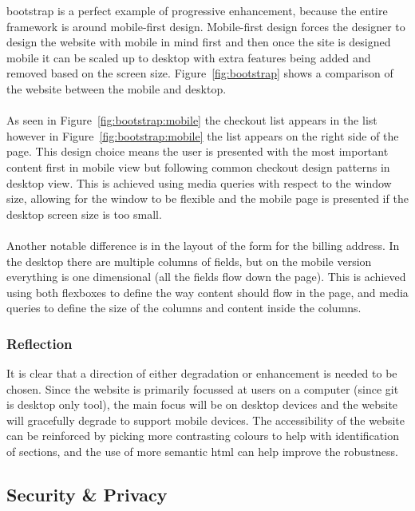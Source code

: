 \gls{bootstrap} is a perfect example of progressive enhancement, because the entire framework is around mobile-first design. Mobile-first design forces the designer to design the website with mobile in mind first and then once the site is designed mobile it can be scaled up to desktop with extra features being added and removed based on the screen size. Figure~\ref{fig:bootstrap} shows a comparison of the website between the mobile and desktop.\\\\
As seen in Figure~\ref{fig:bootstrap:mobile} the checkout list appears in the list however in Figure~\ref{fig:bootstrap:mobile} the list appears on the right side of the page. This design choice means the user is presented with the most important content first in mobile view but following common checkout design patterns in desktop view. This is achieved using media queries with respect to the window size, allowing for the window to be flexible and the mobile page is presented if the desktop screen size is too small.\\\\
Another notable difference is in the layout of the form for the billing address. In the desktop there are multiple columns of fields, but on the mobile version everything is one dimensional (all the fields flow down the page). This is achieved using both flexboxes to define the way content should flow in the page, and media queries to define the size of the columns and content inside the columns.

\subsubsection{Reflection}
It is clear that a direction of either degradation or enhancement is needed to be chosen. Since the website is primarily focussed at users on a computer (since \gls{git} is desktop only tool), the main focus will be on desktop devices and the website will gracefully degrade to support mobile devices. The accessibility of the website can be reinforced by picking more contrasting colours to help with identification of sections, and the use of more semantic \gls{html} can help improve the robustness.

\subsection{Security \& Privacy}
